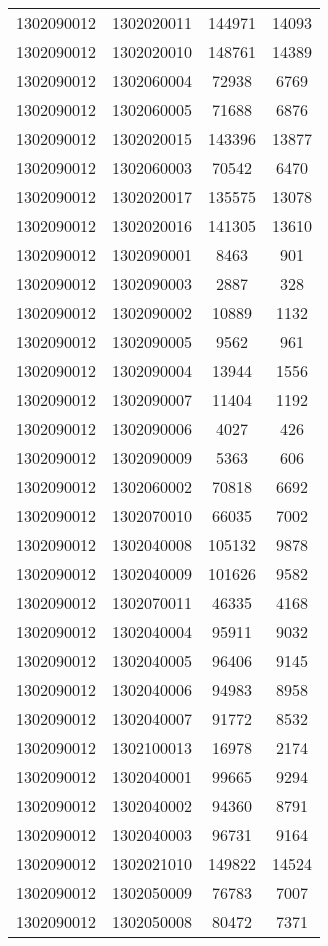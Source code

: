 \begin{longtable}[h]{llcc}
		1302090012 & 1302020011 & 144971 & 14093\\
		1302090012 & 1302020010 & 148761 & 14389\\
		1302090012 & 1302060004 & 72938 & 6769\\
		1302090012 & 1302060005 & 71688 & 6876\\
		1302090012 & 1302020015 & 143396 & 13877\\
		1302090012 & 1302060003 & 70542 & 6470\\
		1302090012 & 1302020017 & 135575 & 13078\\
		1302090012 & 1302020016 & 141305 & 13610\\
		1302090012 & 1302090001 & 8463 & 901\\
		1302090012 & 1302090003 & 2887 & 328\\
		1302090012 & 1302090002 & 10889 & 1132\\
		1302090012 & 1302090005 & 9562 & 961\\
		1302090012 & 1302090004 & 13944 & 1556\\
		1302090012 & 1302090007 & 11404 & 1192\\
		1302090012 & 1302090006 & 4027 & 426\\
		1302090012 & 1302090009 & 5363 & 606\\
		1302090012 & 1302060002 & 70818 & 6692\\
		1302090012 & 1302070010 & 66035 & 7002\\
		1302090012 & 1302040008 & 105132 & 9878\\
		1302090012 & 1302040009 & 101626 & 9582\\
		1302090012 & 1302070011 & 46335 & 4168\\
		1302090012 & 1302040004 & 95911 & 9032\\
		1302090012 & 1302040005 & 96406 & 9145\\
		1302090012 & 1302040006 & 94983 & 8958\\
		1302090012 & 1302040007 & 91772 & 8532\\
		1302090012 & 1302100013 & 16978 & 2174\\
		1302090012 & 1302040001 & 99665 & 9294\\
		1302090012 & 1302040002 & 94360 & 8791\\
		1302090012 & 1302040003 & 96731 & 9164\\
		1302090012 & 1302021010 & 149822 & 14524\\
		1302090012 & 1302050009 & 76783 & 7007\\
		1302090012 & 1302050008 & 80472 & 7371\\

\end{longtable}

